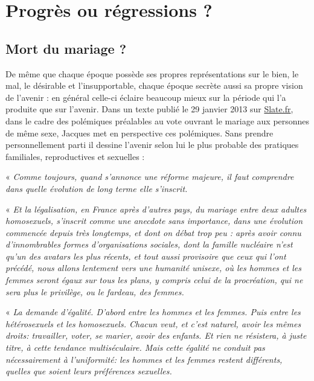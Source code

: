 

\chapter{Progrès ou régressions ?}


 
\section{Mort du mariage ?}
 
 
 De même que chaque époque possède ses propres représentations sur le bien, le mal, le désirable et l'insupportable, chaque époque secrète aussi sa propre vision de l'avenir : en général celle-ci éclaire beaucoup mieux sur la période qui l'a produite que sur l'avenir. Dans un texte publié le 29 janvier 2013 sur \href{http://www.slate.fr}{Slate.fr}, dans le cadre des polémiques préalables au vote ouvrant le mariage aux personnes de même sexe, Jacques  met en perspective ces polémiques. Sans prendre personnellement parti il dessine l'avenir selon lui le plus probable des pratiques familiales, reproductives et sexuelles : 

« \emph{Comme toujours, quand s'annonce une réforme majeure, il faut comprendre dans quelle évolution de long terme elle s'inscrit.}
 
« \emph{Et la légalisation, en France après d'autres pays, du mariage entre deux adultes homosexuels, s'inscrit comme une anecdote sans importance, dans une évolution commencée depuis très longtemps, et dont on débat trop peu : après avoir connu d'innombrables formes d'organisations sociales, dont la famille nucléaire n'est qu'un des avatars les plus récents, et tout aussi provisoire que ceux qui l'ont précédé, nous allons lentement vers une humanité unisexe, où les hommes et les femmes seront égaux sur tous les plans, y compris celui de la procréation, qui ne sera plus le privilège, ou le fardeau, des femmes.} 
 
« \emph{\primo La demande d'égalité. D'abord entre les hommes et les femmes. Puis entre les hétérosexuels et les homosexuels. Chacun veut, et c'est naturel, avoir les mêmes droits: travailler, voter, se marier, avoir des enfants. Et rien ne résistera, à juste titre, à cette tendance multiséculaire. Mais cette égalité ne conduit pas nécessairement à l'uniformité: les hommes et les femmes restent différents, quelles que soient leurs préférences sexuelles.}
 
